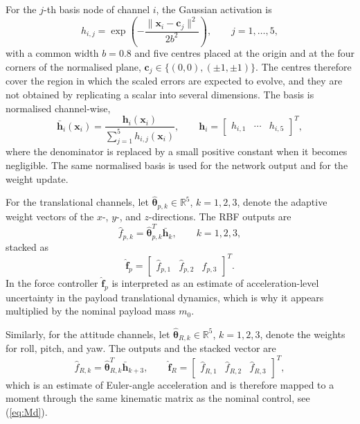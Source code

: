 \documentclass[Review,sageh,times]{sagej}
\begin{document}
For the $j$-th basis node of channel $i$, the Gaussian activation is
\begin{equation}
h_{i,j} = \exp\left(-\frac{\|\mathbf{x}_i - \mathbf{c}_j\|^2}{2b^2}\right),
\qquad j=1,\ldots,5,
\label{eq:gauss}
\end{equation}
with a common width $b=0.8$ and five centres placed at the origin and at the
four corners of the normalised plane,
$\mathbf{c}_j\in\{(0,0),(\pm1,\pm1)\}$. The centres therefore cover the
region in which the scaled errors are expected to evolve, and they are not
obtained by replicating a scalar into several dimensions. The basis is
normalised channel-wise,
\begin{equation}
\bar{\mathbf{h}}_i(\mathbf{x}_i) =
\frac{\mathbf{h}_i(\mathbf{x}_i)}{\sum_{j=1}^{5}h_{i,j}(\mathbf{x}_i)},
\qquad
\mathbf{h}_i =
\begin{bmatrix}
h_{i,1} & \cdots & h_{i,5}
\end{bmatrix}^{T},
\label{eq:normbasis}
\end{equation}
where the denominator is replaced by a small positive constant when it
becomes negligible. The same normalised basis is used for the network
output and for the weight update.

For the translational channels, let $\hat{\boldsymbol{\theta}}_{p,k}\in\mathbb{R}^5$,
$k=1,2,3$, denote the adaptive weight vectors of the $x$-, $y$-, and
$z$-directions. The RBF outputs are
\begin{equation}
\hat{f}_{p,k} = \hat{\boldsymbol{\theta}}_{p,k}^{T}\bar{\mathbf{h}}_k,
\qquad k=1,2,3,
\label{eq:rbfpos}
\end{equation}
stacked as
\begin{equation}
\hat{\mathbf{f}}_p =
\begin{bmatrix}
\hat{f}_{p,1} & \hat{f}_{p,2} & \hat{f}_{p,3}
\end{bmatrix}^{T}.
\label{eq:rbfposvec}
\end{equation}
In the force controller $\hat{\mathbf{f}}_p$ is interpreted as an estimate of
acceleration-level uncertainty in the payload translational dynamics, which
is why it appears multiplied by the nominal payload mass $m_0$.

Similarly, for the attitude channels, let $\hat{\boldsymbol{\theta}}_{R,k}\in\mathbb{R}^5$,
$k=1,2,3$, denote the weights for roll, pitch, and yaw. The outputs and the
stacked vector are
\begin{equation}
\hat{f}_{R,k} = \hat{\boldsymbol{\theta}}_{R,k}^{T}\bar{\mathbf{h}}_{k+3},
\qquad
\hat{\mathbf{f}}_R =
\begin{bmatrix}
\hat{f}_{R,1} & \hat{f}_{R,2} & \hat{f}_{R,3}
\end{bmatrix}^{T},
\label{eq:rbfatt}
\end{equation}
which is an estimate of Euler-angle acceleration and is therefore mapped to
a moment through the same kinematic matrix as the nominal control, see
(\ref{eq:Md}).
\end{document}
